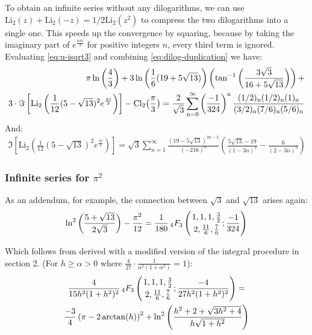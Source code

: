 \documentclass[12pt]{article}
\begin{document}
\noindent To obtain an infinite series without any dilogarithms, we can use $\text{Li}_2(z)+\text{Li}_2(-z)=1/2\text{Li}_2(z^{2})$ to compress the two dilogarithms into a single one. This speeds up the convergence by squaring, because by taking the imaginary part of  $e^{\frac{n\pi i}{3}}$ for positive integers $n$, every third term is ignored. Evaluating \eqref{eq:u-isqrt3} and combining \eqref{eq:dilog-duplication} we have:
\begin{equation}
\begin{aligned}
 \pi \ln\left(\frac{4}{3}\right) + 3\ln\left(\frac{1}{6}(19 + 5\sqrt{13})\right)\left( \tan^{-1}\left(\frac{3\sqrt{3}}{16 + 5\sqrt{13}}\right)\right)
+ \\
3\cdot\Im\left[\text{Li}_2\left(\frac{1}{12}(5 - \sqrt{13})^2 e^{\frac{\pi i}{3}}\right)\right] - \rm{Cl}_2\big(\frac{\pi}3\big)
=\frac{2}{\sqrt{3}}\sum_{n=0}^{\infty}  \left(  \frac{-1}{324}  \right)^{n} \frac{ (1/2)_n(1/2)_n(1)_n}{(3/2)_n(7/6)_n(5/6)_n}
\end{aligned}
\end{equation}
And:
\begin{equation}
\begin{aligned}
\Im\left[\text{Li}_2\left(\frac{1}{12}(5 - \sqrt{13})^2 e^{\frac{\pi i}{3}}\right)\right]=\sqrt{3}\sum_{n=1}^{\infty} \frac{(19 - 5 \sqrt{13})^{3n - 2} }{(-216)^n} \left( \frac{5 \sqrt{13} - 19}{(1 - 3n)^2} - \frac{6}{(2 - 3n)^2} \right)
\end{aligned}
\end{equation}

\subsubsection{Infinite series for  $\pi^2$ }

\noindent As an addendum, for example, the connection between $\sqrt{3}$ and $\sqrt{13}$ arises again:
\begin{equation}
\ln^2\left(\frac{5 + \sqrt{13}}{2\sqrt{3}}\right) - \frac{\pi^2}{12}=\frac{1}{180}\, _4F_3\left({1,1,1,\frac{3}{2}\atop 2,\frac{11}{6},\frac{7}{6}};\frac{-1}{324}\right)
\end{equation}

\noindent Which follows from derived  with a modified version of the integral procedure in section 2. (For $h \geq \alpha >0 $ where $\frac{4}{27} \cdot \frac{1}{\alpha^2 (1 + \alpha^2)} = 1$):
\begin{multline}
\frac{4}{15h^2(1+h^2)^2}\, _4F_3\left({1,1,1,\frac{3}{2}\atop 2,\frac{11}{6},\frac{7}{6}};\frac{-4}{27h^2(1+h^2)^2}\right)=
\\
\frac{-3}{4} \left(\pi - 2\arctan(h)\right)^2 
+ \ln^2\left(\frac{h^2 + 2 + \sqrt{3h^2 + 4}}{h\sqrt{1 + h^2}}\right)
\end{multline}
\end{document}
